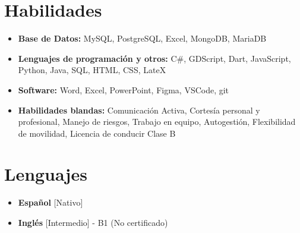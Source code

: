 \documentclass[11pt,a4paper,sans]{moderncv}
\begin{document}
\section{Habilidades}{
\begin{itemize}[label=\textbullet]
    \item {\textbf{Base de Datos:} 
        MySQL, 
        PostgreSQL, 
        Excel, 
        MongoDB, 
        MariaDB
    }
    \item {\textbf{Lenguajes de programación y otros:} 
        C\#, 
        GDScript, 
        Dart, 
        JavaScript, 
        Python, 
        Java,
        SQL,
        HTML,
        CSS,
        LateX
    }
    \item {\textbf{Software:} 
        Word, 
        Excel, 
        PowerPoint, 
        Figma, 
        VSCode, 
        git}
    \item {\textbf{Habilidades blandas:} 
        Comunicación Activa, 
        Cortesía personal y profesional, 
        Manejo de riesgos, 
        Trabajo en equipo, 
        Autogestión, 
        Flexibilidad de movilidad, 
        Licencia de conducir Clase B}
\end{itemize}}

\section{Lenguajes}
\begin{multicols}{2}
    \begin{itemize}[label=\textbullet]
    \item \textbf{Español} [Nativo]
    \item \textbf{Inglés} [Intermedio] - B1 (No certificado)
    \end{itemize}
\end{multicols}
\end{document}
